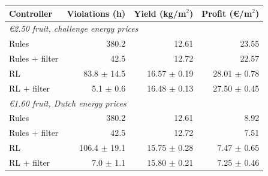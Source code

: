 \documentclass[border=6pt]{standalone}
\begin{document}
\small\begin{tabular}{lrrr}
\toprule
Controller & Violations (h) & Yield (kg/m$^2$) & Profit (\euro/m$^2$) \\
\midrule
\multicolumn{4}{l}{\textit{\euro2.50 fruit, challenge energy prices}} \\
\quad Rules & 380.2 & 12.61 & 23.55 \\
\quad Rules + filter & 42.5 & 12.72 & 22.57 \\
\quad RL & 83.8 $\pm$ 14.5 & 16.57 $\pm$ 0.19 & 28.01 $\pm$ 0.78 \\
\quad RL + filter & 5.1 $\pm$ 0.6 & 16.48 $\pm$ 0.13 & 27.50 $\pm$ 0.45 \\
\midrule
\multicolumn{4}{l}{\textit{\euro1.60 fruit, Dutch energy prices}} \\
\quad Rules & 380.2 & 12.61 & 8.92 \\
\quad Rules + filter & 42.5 & 12.72 & 7.51 \\
\quad RL & 106.4 $\pm$ 19.1 & 15.75 $\pm$ 0.28 & 7.47 $\pm$ 0.65 \\
\quad RL + filter & 7.0 $\pm$ 1.1 & 15.80 $\pm$ 0.21 & 7.25 $\pm$ 0.46 \\
\bottomrule
\end{tabular}
\end{document}
